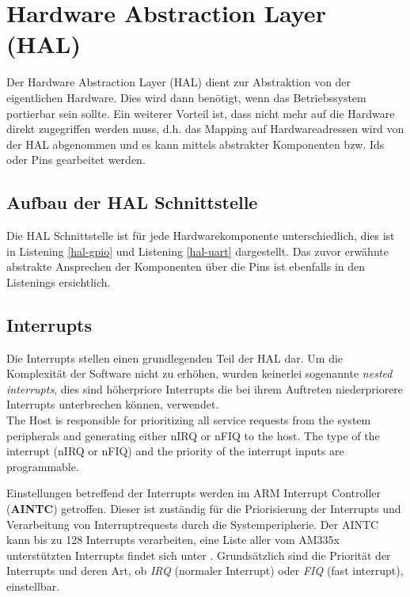 \section{Hardware Abstraction Layer (HAL)}
Der Hardware Abstraction Layer (HAL) dient zur Abstraktion von der eigentlichen Hardware. Dies wird dann benötigt, wenn das Betriebssystem portierbar sein sollte. Ein weiterer Vorteil ist, dass nicht mehr auf die Hardware direkt zugegriffen werden muss, d.h. das Mapping auf Hardwareadressen wird von der HAL abgenommen und es kann mittels abstrakter Komponenten bzw. Ids oder Pins gearbeitet werden. 

\subsection{Aufbau der HAL Schnittstelle}
Die HAL Schnittstelle ist für jede Hardwarekomponente unterschiedlich, dies ist in Listening \ref{hal-gpio} und Listening \ref{hal-uart} dargestellt. Das zuvor erwähnte abstrakte Ansprechen der Komponenten über die Pins ist ebenfalls in den Listenings ersichtlich.





\subsection{Interrupts}

Die Interrupts stellen einen grundlegenden Teil der HAL dar. Um die Komplexität der Software nicht zu erhöhen, wurden keinerlei sogenannte \emph{nested interrupts}, dies sind höherpriore Interrupts die bei ihrem Auftreten niederpriorere Interrupts unterbrechen können, verwendet.\\


The Host is responsible for prioritizing all service requests from the
system peripherals and generating either nIRQ or nFIQ to the host. The type of the interrupt (nIRQ or
nFIQ) and the priority of the interrupt inputs are programmable.

Einstellungen betreffend der Interrupts werden im ARM Interrupt Controller (\textbf{AINTC}) getroffen. Dieser ist zuständig für die Priorisierung der Interrupts und Verarbeitung von Interruptrequests durch die Systemperipherie. Der AINTC kann bis zu 128 Interrupts verarbeiten, eine Liste aller vom AM335x unterstützten Interrupts findet sich unter \cite[S. 199]{ARM:TRM}. Grundsätzlich sind die Priorität der Interrupts und deren Art, ob \emph{IRQ} (normaler Interrupt) oder \emph{FIQ} (fast interrupt), einstellbar.\\ 

